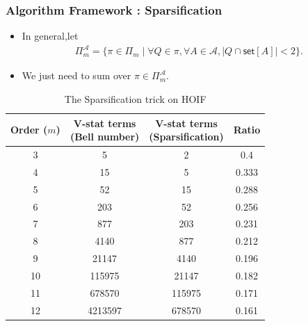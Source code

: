 \documentclass[9pt]{beamer}
\def\calA{\mathcal{A}}
\theoremstyle{mystyle}
\theoremstyle{mystyletwo}
\newcommand{\takesetp}[1]{\mathsf{set}[#1]}
\newcommand{\partition}{\Pi}
\newcommand{\partitionp}[1]{\partition_{#1}}
\begin{document}
\begin{frame}
    \frametitle{Algorithm Framework : Sparsification}
   
    \begin{itemize}
           \item In general,let
           \begin{align*}
               \partitionp{m}^{\calA} = \{ \pi \in \partitionp{m} \mid \forall Q \in \pi, \forall A \in \calA, |Q \cap \takesetp{A}| < 2 \}.
           \end{align*}
           \item We just need to sum over $ \pi \in \partitionp{m}^{\calA}$.

    \end{itemize}
    
           \begin{table}[h!]
            \centering
            \begin{tabular}{cccc}
            \toprule
            \textbf{Order ($m$)} & \makecell{\textbf{V-stat terms} \\ \textbf{(Bell number)}} & \makecell{\textbf{V-stat terms} \\ \textbf{(Sparsification)}} & \textbf{Ratio} \\
            \midrule
            3  & 5       & 2       & 0.4 \\
            4  & 15      & 5       & 0.333 \\
            5  & 52      & 15      & 0.288 \\
            6  & 203     & 52      & 0.256 \\
            7  & 877     & 203     & 0.231 \\
            8  & 4140    & 877     & 0.212 \\
            9  & 21147   & 4140    & 0.196 \\
            10 & 115975  & 21147   & 0.182 \\
            11 & 678570  & 115975  & 0.171 \\
            12 & 4213597 & 678570  & 0.161 \\
            \bottomrule
            \end{tabular}
            \caption{The Sparsification trick on HOIF}
            \end{table}   

\end{frame}
\end{document}
